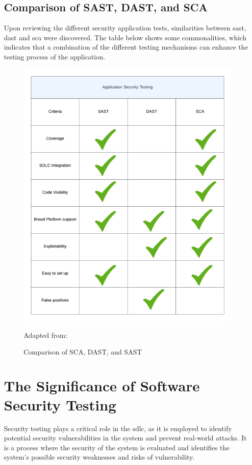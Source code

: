 \subsection{Comparison of SAST, DAST, and SCA}
Upon reviewing the different security application tests, similarities between \acrshort{sast}, \acrshort{dast} and \acrshort{sca} were discovered. The table below shows some commonalities, which indicates that a combination of the different testing mechanisms can enhance the testing process of the application. 
\begin{figure}[H]
    \centering
    \includegraphics[width=0.8\columnwidth]{Images/ApplicationSecurityTesting.png}
    \caption{Comparison of SCA, DAST, and SAST}Adapted from: \cite{Comparison}
    \label{fig: Comparison of SCA, DAST, and SASt}
\end{figure}

\newpage
\section{The Significance of Software Security Testing}
Security testing plays a critical role in the \acrlong{sdlc}, as it is employed to identify potential security vulnerabilities in the system and prevent real-world attacks. It is a process where the security of the system is evaluated and identifies the system's possible security weaknesses and risks of vulnerability.\cite{whysectest}

